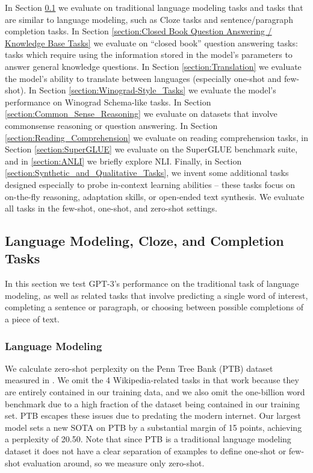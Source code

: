 In Section \ref{section:Language Modeling, Cloze, and Completion Tasks} we evaluate on traditional language modeling tasks and tasks that are similar to language modeling, such as Cloze tasks and sentence/paragraph completion tasks.  In Section \ref{section:Closed Book Question Answering / Knowledge Base Tasks} we evaluate on ``closed book'' question answering tasks: tasks which require using the information stored in the model’s parameters to answer general knowledge questions.  In Section \ref{section:Translation} we evaluate the model’s ability to translate between languages (especially one-shot and few-shot).  In Section \ref{section:Winograd-Style_Tasks} we evaluate the model’s performance on Winograd Schema-like tasks.  In Section \ref{section:Common_Sense_Reasoning} we evaluate on datasets that involve commonsense reasoning or question answering.  In Section \ref{section:Reading_Comprehension} we evaluate on reading comprehension tasks, in Section \ref{section:SuperGLUE} we evaluate on the SuperGLUE benchmark suite, and in \ref{section:ANLI} we briefly explore NLI.  Finally, in Section \ref{section:Synthetic_and_Qualitative_Tasks}, we invent some additional tasks designed especially to probe in-context learning abilities -- these tasks focus on on-the-fly reasoning, adaptation skills, or open-ended text synthesis. We evaluate all tasks in the few-shot, one-shot, and zero-shot settings.

    \subsection{Language Modeling, Cloze, and Completion Tasks}
    \label{section:Language Modeling, Cloze, and Completion Tasks}

In this section we test GPT-3’s performance on the traditional task of language modeling, as well as related tasks that involve predicting a single word of interest, completing a sentence or paragraph, or choosing between possible completions of a piece of text.

        \subsubsection{Language Modeling}
        \label{section:Language Modeling}

We calculate zero-shot perplexity on the Penn Tree Bank (PTB) \cite{marcus1994penn} dataset measured in \cite{radford2019language}. We omit the 4 Wikipedia-related tasks in that work because they are entirely contained in our training data, and we also omit the one-billion word benchmark due to a high fraction of the dataset being contained in our training set.  PTB escapes these issues due to predating the modern internet. Our largest model sets a new SOTA on PTB by a substantial margin of 15 points, achieving a perplexity of 20.50. Note that since PTB is a traditional language modeling dataset it does not have a clear separation of examples to define one-shot or few-shot evaluation around, so we measure only zero-shot.

